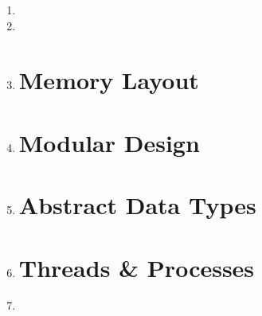 \documentclass[11pt]{article}
\begin{document}
\begin{enumerate}
		\item 

		\item 

		\item 

		\section*{Memory Layout}
		\item 

		\section*{Modular Design}
		\item 

		\section*{Abstract Data Types}
		\item 

		\section*{Threads \& Processes}
		\item 
	\end{enumerate}
\end{document}
